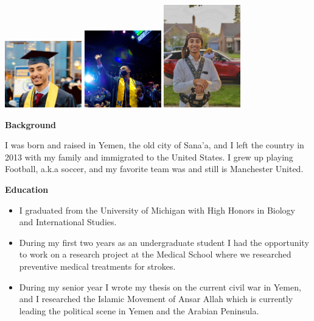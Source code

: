 \documentclass[
]{book}
\providecommand{\tightlist}{%
  \setlength{\itemsep}{0pt}\setlength{\parskip}{0pt}}
\theoremstyle{definition}
\theoremstyle{definition}
\theoremstyle{definition}
\theoremstyle{definition}
\theoremstyle{remark}
\begin{document}
\includegraphics[width=0.25\textwidth,height=\textheight]{jalal1.jpg}
\includegraphics[width=0.25\textwidth,height=\textheight]{jalal2.jpg}
\includegraphics[width=0.25\textwidth,height=\textheight]{jalal3.jpg}

\textbf{Background}

I was born and raised in Yemen, the old city of Sana'a, and I left the country in 2013 with my family and immigrated to the United States. I grew up playing Football, a.k.a soccer, and my favorite team was and still is Manchester United.

\textbf{Education}

\begin{itemize}
\tightlist
\item
  I graduated from the University of Michigan with High Honors in Biology and International Studies.
\item
  During my first two years as an undergraduate student I had the opportunity to work on a research project at the Medical School where we researched preventive medical treatments for strokes.
\item
  During my senior year I wrote my thesis on the current civil war in Yemen, and I researched the Islamic Movement of Ansar Allah which is currently leading the political scene in Yemen and the Arabian Peninsula.
\end{itemize}
\end{document}
